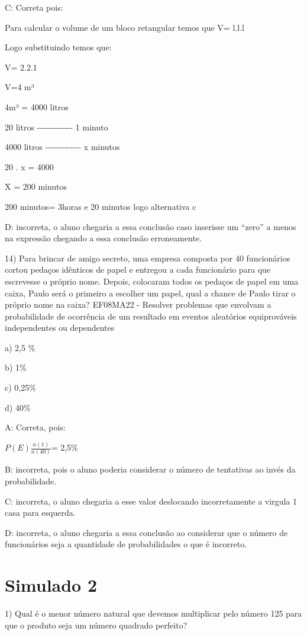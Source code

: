 C: Correta pois:

Para calcular o volume de um bloco retangular temos que V= l.l.l

Logo substituindo temos que:

V= 2.2.1

V=4 m³

4m³ = 4000 litros

20 litros -\/-\/-\/-\/-\/-\/-\/-\/-\/-\/-\/-\/- 1 minuto

4000 litros -\/-\/-\/-\/-\/-\/-\/-\/-\/-\/-\/-\/- x minutos

20 . x = 4000

X = 200 minutos

200 minutos= 3horas e 20 minutos logo alternativa c

D: incorreta, o aluno chegaria a essa conclusão caso inserisse um
``zero'' a menos na expressão chegando a essa conclusão erroneamente.

14) Para brincar de amigo secreto, uma empresa composta por 40
funcionários cortou pedaços idênticos de papel e entregou a cada
funcionário para que escrevesse o próprio nome. Depois, colocaram todos
os pedaços de papel em uma caixa, Paulo será o primeiro a escolher um
papel, qual a chance de Paulo tirar o próprio nome na caixa? EF08MA22 -
Resolver problemas que envolvam a probabilidade de ocorrência de um
resultado em eventos aleatórios equiprováveis independentes ou
dependentes

a) 2,5 \%

b) 1\%

c) 0,25\%

d) 40\%

A: Correta, pois:

\(P(E)\frac{n(1)}{n(40)}\)= 2,5\%

B: incorreta, pois o aluno poderia considerar o número de tentativas ao
invés da probabilidade.

C: incorreta, o aluno chegaria a esse valor deslocando incorretamente a
virgula 1 casa para esquerda.

D: incorreta, o aluno chegaria a essa conclusão ao considerar que o
número de funcionários seja a quantidade de probabilidades o que é
incorreto.

\hypertarget{simulado-2}{%
\section{Simulado 2}\label{simulado-2}}

1) Qual é o menor número natural que devemos multiplicar pelo número 125
para que o produto seja um número quadrado perfeito?


